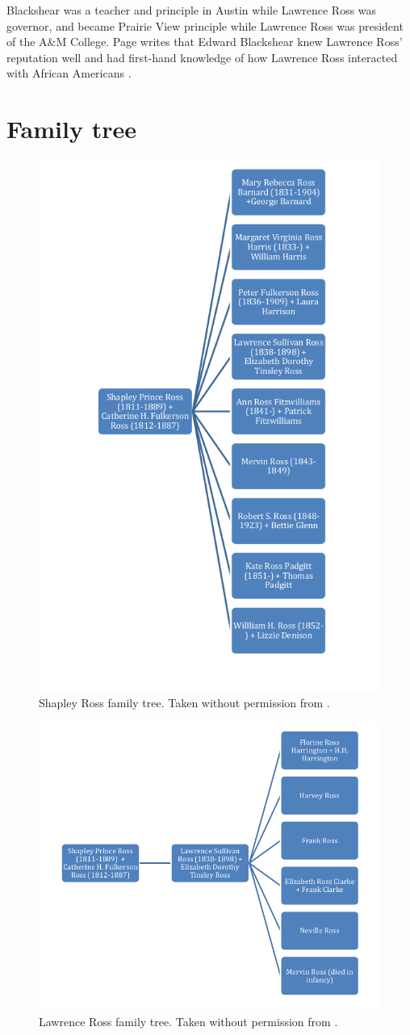 \documentclass[12pt]{article}
\begin{document}
Blackshear was a teacher and principle in Austin while Lawrence Ross was governor, and became Prairie View principle while Lawrence Ross was president of the A\&M College. Page writes that Edward Blackshear knew Lawrence Ross' reputation well and had first-hand knowledge of how Lawrence Ross interacted with African Americans \cite{page:email:blackshear}. 

\newpage
\section{Family tree}

\begin{figure}[h]
\centering
\includegraphics[width=0.6\linewidth]{figures/shapley_ross_family_tree}
\caption{Shapley Ross family tree. Taken without permission from \cite{rosspapersummary}.}
\end{figure}

\begin{figure}[h]
\centering
\includegraphics[width=0.7\linewidth]{figures/lawrence_ross_family_tree}
\caption{Lawrence Ross family tree. Taken without permission from \cite{rosspapersummary}.}
\end{figure}
\end{document}
